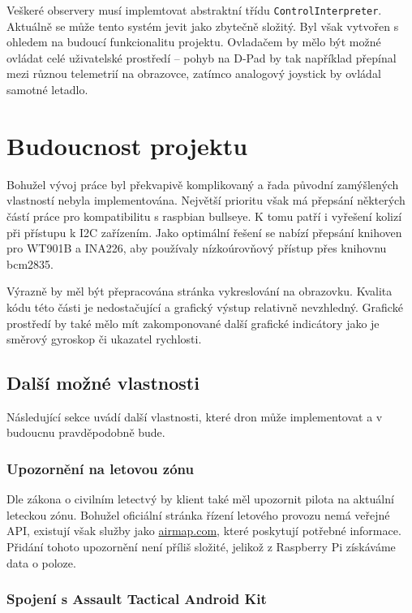 \documentclass[a4paper,oneside,12pt]{report}
\begin{document}
Veškeré observery musí implemtovat abstraktní třídu \verb|ControlInterpreter|.
Aktuálně se může  tento systém jevit jako zbytečně složitý.
Byl však vytvořen s ohledem na budoucí funkcionalitu projektu.
Ovladačem by mělo být možné ovládat celé uživatelské prostředí -- pohyb na D-Pad by tak například přepínal mezi různou telemetrií na obrazovce, zatímco analogový joystick by ovládal samotné letadlo.

\chapter{Budoucnost projektu}

Bohužel vývoj práce byl překvapivě komplikovaný a řada původní zamýšlených vlastností nebyla implementována.
Největší prioritu však má přepsání některých částí práce pro kompatibilitu s raspbian bullseye.
K tomu patří i vyřešení kolizí při přístupu k I2C zařízením.
Jako optimální řešení se nabízí přepsání knihoven pro WT901B a INA226, aby používaly nízkoúrovňový přístup přes knihovnu bcm2835.

Výrazně by měl být přepracována stránka vykreslování na obrazovku.
Kvalita kódu této části je nedostačující a grafický výstup relativně nevzhledný.
Grafické prostředí by také mělo mít zakomponované další grafické indicátory jako je směrový gyroskop či ukazatel rychlosti.

\section{Další možné vlastnosti}

Následující sekce uvádí další vlastnosti, které dron může implementovat a v budoucnu pravděpodobně bude.

\subsection{Upozornění na letovou zónu}
Dle zákona o civilním letectvý by klient také měl upozornit pilota na aktuální leteckou zónu.
Bohužel oficiální stránka řízení letového provozu nemá veřejné API, existují však služby jako \url{airmap.com}, které poskytují potřebné informace.
Přidání tohoto upozornění není příliš složité, jelikož z Raspberry Pi získáváme data o poloze.

\subsection{Spojení s Assault Tactical Android Kit}
\end{document}
